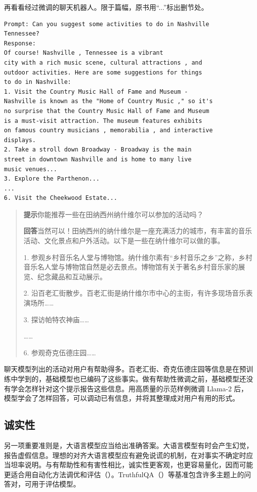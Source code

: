 再看看经过微调的聊天机器人。限于篇幅，原书用“...”标出删节处。

\begin{lstlisting}[caption={有帮助性——聊天模型},label={lst:ch05-help-chat}]
Prompt: Can you suggest some activities to do in Nashville
Tennessee?
Response:
Of course! Nashville , Tennessee is a vibrant
city with a rich music scene, cultural attractions , and
outdoor activities. Here are some suggestions for things
to do in Nashville:
1. Visit the Country Music Hall of Fame and Museum -
Nashville is known as the "Home of Country Music ," so it's
no surprise that the Country Music Hall of Fame and Museum
is a must-visit attraction. The museum features exhibits
on famous country musicians , memorabilia , and interactive
displays.
2. Take a stroll down Broadway - Broadway is the main
street in downtown Nashville and is home to many live
music venues...
3. Explore the Parthenon...
...
6. Visit the Cheekwood Estate...
\end{lstlisting}

\begin{quote}\small
\textbf{提示}\quad 你能推荐一些在田纳西州纳什维尔可以参加的活动吗？

\textbf{回答}\quad 当然可以！田纳西州的纳什维尔是一座充满活力的城市，有丰富的音乐活动、文化景点和户外活动。以下是一些在纳什维尔可以做的事。

1. 参观乡村音乐名人堂与博物馆。纳什维尔素有“乡村音乐之乡”之称，乡村音乐名人堂与博物馆自然是必去景点。博物馆有关于著名乡村音乐家的展览、纪念藏品和互动展示。

2. 沿百老汇街散步。百老汇街是纳什维尔市中心的主街，有许多现场音乐表演场所……

3. 探访帕特农神庙……

……

6. 参观奇克伍德庄园……
\end{quote}

聊天模型列出的活动对用户有帮助得多。百老汇街、奇克伍德庄园等信息是在预训练中学到的，基础模型也已编码了这些事实。做有帮助性微调之前，基础模型还没有学会怎样针对这个提示报告这些信息。用高质量的示范样例微调 Llama-2 后，模型学会了怎样回答，可以调动已有信息，并将其整理成对用户有用的形式。

\subsection{诚实性}
另一项重要准则是，大语言模型应当给出准确答案。大语言模型有时会产生幻觉，报告虚假信息。理想的对齐大语言模型应有避免说谎的机制，在对事实不确定时应当坦率说明。与有帮助性和有害性相比，诚实性更客观，也更容易量化，因而可能更适合用自动化方法调优和评估（）。TruthfulQA（）等基准包含许多主题上的问答对，可用于评估模型。

